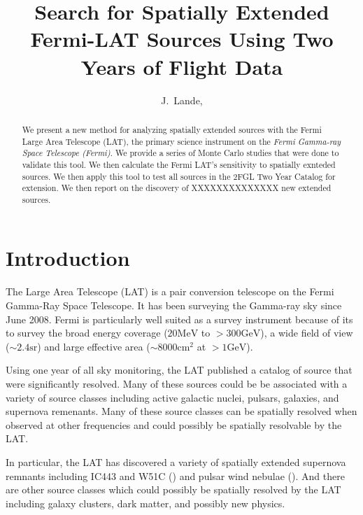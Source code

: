 \documentclass[preprint]{aastex}
\newcommand{\mev}{\text{MeV}\xspace}
\newcommand{\gev}{\text{GeV}\xspace}
\newcommand{\sr}{\text{sr}\xspace}
\newcommand{\cm}{\text{cm}\xspace}
\begin{document}
\title{Search for Spatially Extended Fermi-LAT Sources Using Two Years of Flight
Data}

\author{
J.~Lande, 
}


\begin{abstract}
We present a new method for analyzing spatially extended sources with
the Fermi Large Area Telescope (LAT), the primary science instrument
on the {\em Fermi Gamma-ray Space Telescope (Fermi)}.  We provide a
series of Monte Carlo studies that were done to validate this tool.
We then calculate the Fermi LAT's sensitivity to spatially exnteded
sources.  We then apply this tool to test all sources in the 2FGL Two
Year Catalog for extension.\cite{2fgl} We then report on the discovery
of XXXXXXXXXXXXXX new extended sources.
\end{abstract}

\section{Introduction}


The Large Area Telescope (LAT) is a pair conversion telescope on the
Fermi Gamma-Ray Space Telescope. It has been surveying the Gamma-ray
sky since June 2008.  Fermi is particularly well suited as a survey
instrument because of its to survey the broad energy coverage ($20\mev$
to $>300\gev$), a wide field of view ($\sim 2.4 \sr$) and large effective
area ($\sim 8000 \cm^2$ at $>1\gev$).

Using one year of all sky monitoring, the LAT published a catalog of
source that were significantly resolved.  Many of these sources could
be be associated with a variety of source classes including active
galactic nuclei, pulsars, galaxies, and supernova remenants.  Many of
these source classes can be spatially resolved when observed at other
frequencies and could possibly be spatially resolvable by the LAT.

In particular, the LAT has discovered a variety of spatially extended
supernova remnants including IC443 and W51C (\cite{ic443,w51c}) and pulsar
wind nebulae (\cite{msh1552,velax}). And there are other source classes
which could possibly be spatially resolved by the LAT including galaxy
clusters, dark matter, and possibly new physics.
\end{document}

